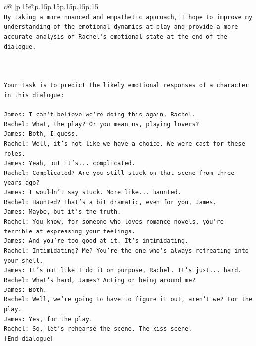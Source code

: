 \documentclass{article}
\begin{document}
{\begin{supertabular}{c@{$\;$}|p{.15\linewidth}@{}p{.15\linewidth}p{.15\linewidth}p{.15\linewidth}p{.15\linewidth}p{.15\linewidth}}
{{{\\ 
\texttt{By taking a more nuanced and empathetic approach, I hope to improve my understanding of the emotional dynamics at play and provide a more accurate analysis of Rachel's emotional state at the end of the dialogue.} \\
\\ 
\\ 
\\ 
\texttt{Your task is to predict the likely emotional responses of a character in this dialogue:} \\
\\ 
\texttt{James: I can't believe we're doing this again, Rachel. } \\
\texttt{Rachel: What, the play? Or you mean us, playing lovers?} \\
\texttt{James: Both, I guess. } \\
\texttt{Rachel: Well, it's not like we have a choice. We were cast for these roles. } \\
\texttt{James: Yeah, but it's... complicated.} \\
\texttt{Rachel: Complicated? Are you still stuck on that scene from three years ago?} \\
\texttt{James: I wouldn't say stuck. More like... haunted.} \\
\texttt{Rachel: Haunted? That's a bit dramatic, even for you, James.} \\
\texttt{James: Maybe, but it's the truth.} \\
\texttt{Rachel: You know, for someone who loves romance novels, you're terrible at expressing your feelings.} \\
\texttt{James: And you're too good at it. It's intimidating.} \\
\texttt{Rachel: Intimidating? Me? You're the one who's always retreating into your shell.} \\
\texttt{James: It's not like I do it on purpose, Rachel. It's just... hard.} \\
\texttt{Rachel: What's hard, James? Acting or being around me?} \\
\texttt{James: Both.} \\
\texttt{Rachel: Well, we're going to have to figure it out, aren't we? For the play.} \\
\texttt{James: Yes, for the play.} \\
\texttt{Rachel: So, let's rehearse the scene. The kiss scene.} \\
\texttt{{[}End dialogue{]}} \\
}}}
\end{supertabular}}
\end{document}

